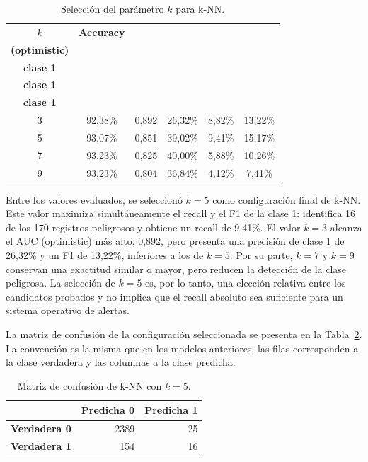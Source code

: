\documentclass[12pt,a4paper]{article}
\begin{document}
\begin{table}[H]
\centering
\caption{Selección del parámetro $k$ para k-NN.}
\label{tab:knn-k-selection}
\small
\begin{tabular}{@{}c c c c c c@{}}
\toprule
\textbf{$k$} & \textbf{Accuracy} & \shortstack{\textbf{AUC}\\\textbf{(optimistic)}} & \shortstack{\textbf{Precision}\\\textbf{clase 1}} & \shortstack{\textbf{Recall}\\\textbf{clase 1}} & \shortstack{\textbf{F1}\\\textbf{clase 1}} \\
\midrule
3 & 92,38\% & 0,892 & 26,32\% & 8,82\% & 13,22\% \\
5 & 93,07\% & 0,851 & 39,02\% & 9,41\% & 15,17\% \\
7 & 93,23\% & 0,825 & 40,00\% & 5,88\% & 10,26\% \\
9 & 93,23\% & 0,804 & 36,84\% & 4,12\% & 7,41\% \\
\bottomrule
\end{tabular}
\end{table}

Entre los valores evaluados, se seleccionó $k=5$ como configuración final de k-NN. Este valor maximiza simultáneamente el recall y el F1 de la clase 1: identifica 16 de los 170 registros peligrosos y obtiene un recall de 9,41\%. El valor $k=3$ alcanza el AUC (optimistic) más alto, 0,892, pero presenta una precisión de clase 1 de 26,32\% y un F1 de 13,22\%, inferiores a los de $k=5$. Por su parte, $k=7$ y $k=9$ conservan una exactitud similar o mayor, pero reducen la detección de la clase peligrosa. La selección de $k=5$ es, por lo tanto, una elección relativa entre los candidatos probados y no implica que el recall absoluto sea suficiente para un sistema operativo de alertas.

La matriz de confusión de la configuración seleccionada se presenta en la Tabla~\ref{tab:knn-k5-matrix}. La convención es la misma que en los modelos anteriores: las filas corresponden a la clase verdadera y las columnas a la clase predicha.

\begin{table}[H]
\centering
\caption{Matriz de confusión de k-NN con $k=5$.}
\label{tab:knn-k5-matrix}
\begin{tabular}{lrr}
\toprule
 & \textbf{Predicha 0} & \textbf{Predicha 1} \\
\midrule
\textbf{Verdadera 0} & 2389 & 25 \\
\textbf{Verdadera 1} & 154 & 16 \\
\bottomrule
\end{tabular}
\end{table}
\end{document}
